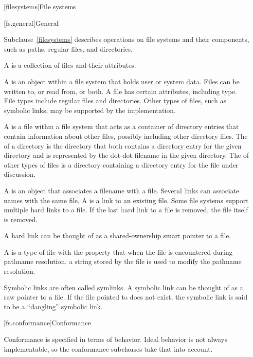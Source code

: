 [filesystems]{File systems}

[fs.general]{General}

\pnum
Subclause~\ref{filesystems} describes operations on file systems and their components, such as paths,
regular files, and directories.

\pnum
A  is
a collection of files and their attributes.

\pnum
A  is
an object within a file system that holds user or system data. Files can be written to, or read from, or both. A file
has certain attributes, including type. File types include regular files
and directories. Other types of files, such as symbolic links,
may be supported by the implementation.

\pnum
A  is
a file within a file system that acts as a container of directory entries
that contain information about
other files, possibly including other directory files.
The  of a directory is
the directory that both contains a
directory entry for the given directory and is represented by the dot-dot
filename in the given directory.
The 
of other types of files is a directory containing a directory
entry for the file under discussion.

\pnum
A  is
an object that associates a filename with a file. Several links can associate names with the same file.
A  is
a link to an existing file. Some
file systems support multiple hard links to a file. If the last hard link to a
file is removed, the file itself is removed.
\begin{note}
A hard link can be thought of as a shared-ownership smart
pointer to a file.
\end{note}
A  is
a type of file with the
property that when the file is encountered during pathname resolution, a string
stored by the file is used to modify the pathname resolution.
\begin{note}
Symbolic links are often called symlinks. A symbolic link can be thought of as a raw pointer to a file.
If the file pointed to does not exist, the symbolic link is said to be a
``dangling'' symbolic link.
\end{note}

[fs.conformance]{Conformance}

\pnum
Conformance is specified in terms of behavior. Ideal behavior is not always
implementable, so the conformance subclauses take that into account.

